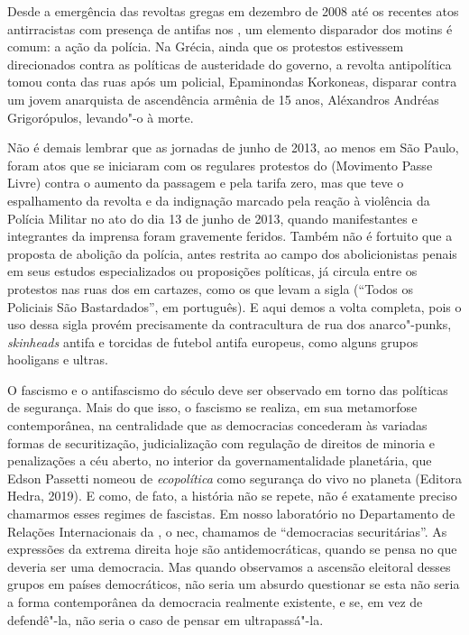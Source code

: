 Desde a emergência das revoltas gregas em dezembro de 2008 até os
recentes atos antirracistas com presença de antifas nos , um elemento
disparador dos motins é comum: a ação da polícia. Na Grécia, ainda que
os protestos estivessem direcionados contra as políticas de austeridade
do governo, a revolta antipolítica tomou conta das ruas após um
policial, Epaminondas Korkoneas, disparar contra um jovem anarquista de
ascendência armênia de 15 anos, Aléxandros Andréas Grigorópulos,
levando"-o à morte.

Não é demais lembrar que as jornadas de junho de 2013, ao menos em São
Paulo, foram atos que se iniciaram com os regulares protestos do 
(Movimento Passe Livre) contra o aumento da passagem e pela tarifa zero,
mas que teve o espalhamento da revolta e da indignação marcado pela
reação à violência da Polícia Militar no ato do dia 13 de junho de 2013,
quando manifestantes e integrantes da imprensa foram gravemente feridos.
Também não é fortuito que a proposta de abolição da polícia, antes
restrita ao campo dos abolicionistas penais em seus estudos
especializados ou proposições políticas, já circula entre os protestos
nas ruas dos  em cartazes, como os que levam a sigla 
(``Todos os Policiais São Bastardados'', em português). E aqui demos a
volta completa, pois o uso dessa sigla provém precisamente da
contracultura de rua dos anarco"-punks, \emph{skinheads} antifa e torcidas de
futebol antifa europeus, como alguns grupos hooligans e ultras.

O fascismo e o antifascismo do século  deve ser observado em torno
das políticas de segurança. Mais do que isso, o fascismo se realiza, em
sua metamorfose contemporânea, na centralidade que as democracias
concederam às variadas formas de securitização, judicialização com
regulação de direitos de minoria e penalizações a céu aberto, no
interior da governamentalidade planetária, que Edson Passetti nomeou de
\emph{ecopolítica} como segurança do vivo no planeta (Editora Hedra,
2019). E como, de fato, a história não se repete, não é exatamente preciso
chamarmos esses regimes de fascistas. Em nosso laboratório no
Departamento de Relações Internacionais da , o nec, chamamos
de ``democracias securitárias''. As expressões da extrema direita hoje
são antidemocráticas, quando se pensa no que deveria ser uma democracia.
Mas quando observamos a ascensão eleitoral desses grupos em países
democráticos, não seria um absurdo questionar se esta não seria a forma
contemporânea da democracia realmente existente, e se, em vez de
defendê"-la, não seria o caso de pensar em ultrapassá"-la.

